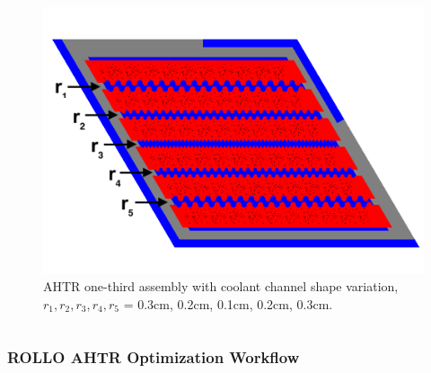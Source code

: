 \begin{frame}
\begin{columns}[t]
\begin{column}{0.5\textwidth}
{\begin{figure}
                \includegraphics[width=\linewidth]{../docs/figures/coolant-channel-shape-assem.png} 
                \caption{AHTR one-third assembly with coolant channel shape variation, 
                $r_1, r_2, r_3, r_4, r_5$ = 0.3cm, 0.2cm, 0.1cm, 0.2cm, 0.3cm.}
            \end{figure}}
        \end{column}
        \end{columns}
\end{frame}

\begin{frame}
    \frametitle{ROLLO AHTR Optimization Workflow}
    \vspace{-0.2cm}
    \begin{figure}
    \end{figure}
\end{frame}

